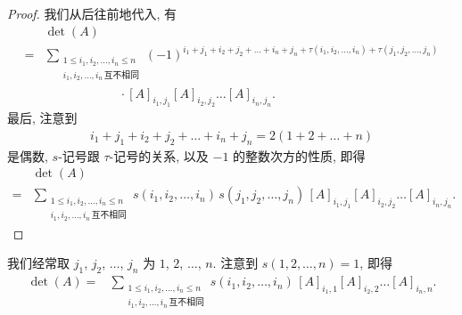 \begin{proof}
    我们从后往前地代入, 有
    \begin{align*}
             & \det {(A)}
        \\
        = {} & \sum_{\substack{
        1 \leq i_1, i_2, \dots, i_n \leq n \\
                i_1, i_2, \dots, i_n\,\text{互不相同}
            }}
        {(-1)^{i_1 + j_1 + i_2 + j_2 + \dots + i_n + j_n
                    + \tau(i_1, i_2, \dots, i_n)
                    + \tau(j_1, j_2, \dots, j_n)}}
        \\
             &
        \qquad \qquad \qquad
        \cdot
        [A]_{i_1,j_1} [A]_{i_2,j_2} \dots [A]_{i_n,j_n}.
    \end{align*}
    最后, 注意到
    \begin{align*}
        i_1 + j_1 + i_2 + j_2 + \dots + i_n + j_n
        = 2(1 + 2 + \dots + n)
    \end{align*}
    是偶数,
    \(s\)-记号跟 \(\tau\)-记号的关系,
    以及 \(-1\) 的整数次方的性质,
    即得
    \begin{align*}
             & \det {(A)}
        \\
        = {} &
        \sum_{\substack{
        1 \leq i_1, i_2, \dots, i_n \leq n \\
                i_1, i_2, \dots, i_n\,\text{互不相同}
            }}
        {s(i_1, i_2, \dots, i_n)\,
            s(j_1, j_2, \dots, j_n)\,
            [A]_{i_1,j_1} [A]_{i_2,j_2} \dots [A]_{i_n,j_n}}.
    \end{align*}
\end{proof}

我们经常取 \(j_1\), \(j_2\), \(\dots\), \(j_n\)
为 \(1\), \(2\), \(\dots\), \(n\).
注意到 \(s(1, 2, \dots, n) = 1\),
即得
\begin{align*}
    \det {(A)}
    = {} &
    \sum_{\substack{
    1 \leq i_1, i_2, \dots, i_n \leq n \\
            i_1, i_2, \dots, i_n\,\text{互不相同}
        }}
    {s(i_1, i_2, \dots, i_n)\,
        [A]_{i_1,1} [A]_{i_2,2} \dots [A]_{i_n,n}}.
\end{align*}

